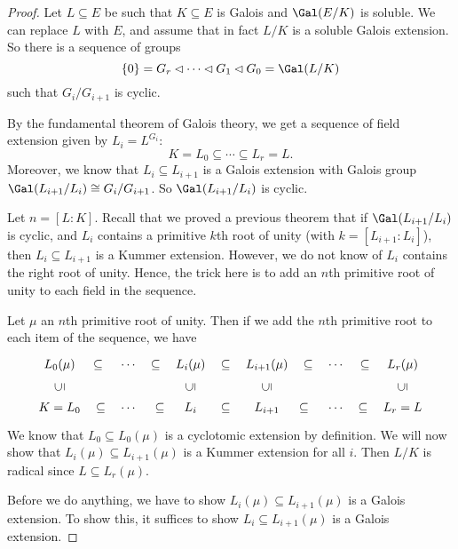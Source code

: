 \documentclass[a4paper]{article}
\begin{document}
\begin{proof}
  Let $L \subseteq E$ be such that $K \subseteq E$ is Galois and $\Gal(E/K)$ is soluble. We can replace $L$ with $E$, and assume that in fact $L/K$ is a soluble Galois extension. So there is a sequence of groups
  \[
    \{0\} = G_r \lhd \cdots \lhd G_1 \lhd G_0 = \Gal(L/K)
  \]
  such that $G_i/G_{i + 1}$ is cyclic.

  By the fundamental theorem of Galois theory, we get a sequence of field extension given by $L_i = L^{G_i}$:
  \[
    K = L_0 \subseteq \cdots \subseteq L_r = L.
  \]
  Moreover, we know that $L_i \subseteq L_{i + 1}$ is a Galois extension with Galois group $\Gal(L_{i + 1}/L_i) \cong G_i/G_{i + 1}$. So $\Gal(L_{i + 1}/L_i)$ is cyclic.

  Let $n = [L:K]$. Recall that we proved a previous theorem that if $\Gal(L_{i + 1}/L_i)$ is cyclic, and $L_i$ contains a primitive $k$th root of unity (with $k = [L_{i + 1}:L_i]$), then $L_i \subseteq L_{i + 1}$ is a Kummer extension. However, we do not know of $L_i$ contains the right root of unity. Hence, the trick here is to add an $n$th primitive root of unity to each field in the sequence.

  Let $\mu$ an $n$th primitive root of unity. Then if we add the $n$th primitive root to each item of the sequence, we have
  \[
    \begin{tikzcd}
      L_0(\mu) \ar[r, phantom, "{\subseteq}"] \ar [d, phantom, "\rotatebox{90}{$\subseteq$}"] & \cdots \ar [r, phantom, "{\subseteq}"] & L_i(\mu) \ar[r, phantom, "{\subseteq}"] \ar [d, phantom, "\rotatebox{90}{$\subseteq$}"]& L_{i + 1}(\mu) \ar[r, phantom, "{\subseteq}"] \ar [d, phantom, "\rotatebox{90}{$\subseteq$}"]& \cdots \ar [r, phantom, "{\subseteq}"] & L_r(\mu)\ar [d, phantom, "\rotatebox{90}{$\subseteq$}"]\\
      K = L_0 \ar[r, phantom, "{\subseteq}"] & \cdots \ar [r, phantom, "{\subseteq}"] & L_i \ar[r, phantom, "{\subseteq}"] & L_{i + 1} \ar[r, phantom, "{\subseteq}"] & \cdots \ar [r, phantom, "{\subseteq}"] & L_r = L
    \end{tikzcd}
  \]
  We know that $L_0\subseteq L_0(\mu)$ is a cyclotomic extension by definition. We will now show that $L_i(\mu) \subseteq L_{i + 1}(\mu)$ is a Kummer extension for all $i$. Then $L/K$ is radical since $L\subseteq L_r(\mu)$.

  Before we do anything, we have to show $L_i(\mu) \subseteq L_{i + 1}(\mu)$ is a Galois extension. To show this, it suffices to show $L_i \subseteq L_{i + 1}(\mu)$ is a Galois extension.


\end{proof}
\end{document}
